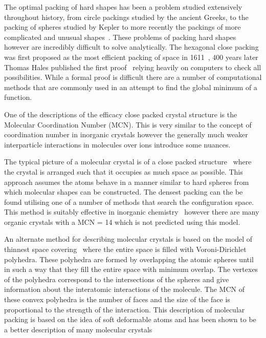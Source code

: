 The optimal packing of hard shapes has been a problem studied extensively throughout history, from circle packings studied by the ancient Greeks, to the packing of spheres studied by Kepler to more recently the packings of more complicated and unusual shapes~\cite{atkinson:12,torquato:12}. These problems of packing hard shapes however are incredibly difficult to solve analytically. The hexagonal close packing was first proposed as the most efficient packing of space in 1611~\cite{kepler:1611}, 400 years later Thomas Hales published the first proof~\cite{hales:05,hales:14} relying heavily on computers to check all possibilities. While a formal proof is difficult there are a number of computational methods that are commonly used in an attempt to find the global minimum of a function.

One of the descriptions of the efficacy close packed crystal structure is the Molecular Coordination Number (MCN). This is very similar to the concept of coordination number in inorganic crystals however the generally much weaker interparticle interactions in molecules over ions introduce some nuances.

The typical picture of a molecular crystal is of a close packed structure~\cite{kitaigorodskii:73} where the crystal is arranged such that it occupies as much space as possible. This approach assumes the atoms behave in a manner similar to hard spheres from which molecular shapes can be constructed. The densest packing can the be found utilising one of a number of methods that search the configuration space. This method is suitably effective in inorganic chemistry~\cite{wells:84} however there are many organic crystals with a MCN = 14 which is not predicted using this model.

An alternate method for describing molecular crystals is based on the model of thinnest space covering~\cite{blatov:95} where the entire space is filled with Voroni-Dirichlet polyhedra. These polyhedra are formed by overlapping the atomic spheres until in such a way that they fill the entire space with minimum overlap. The vertexes of the polyhedra correspond to the intersections of the spheres and give information about the interatomic interactions of the molecule. The MCN of these convex polyhedra is the number of faces and the size of the face is proportional to the strength of the interaction. This description of molecular packing is based on the idea of soft deformable atoms and has been shown to be a better description of many molecular crystals~\cite{blatov:97,peresypkina:99,peresypkina:00}


